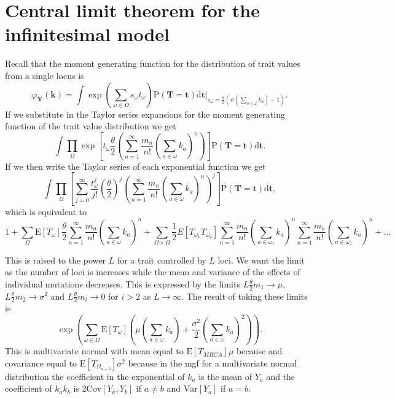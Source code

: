 \documentclass{article}
\newcommand{\T}{\frac{\theta}{2}}
\newcommand{\E}{\mathrm{E}}
\newcommand{\Var}{\mathrm{Var}}
\newcommand{\Cov}{\mathrm{Cov}}
\newcommand{\Pro}{\mathrm{P}}
\begin{document}
 

\clearpage

\appendix
\section{Central limit theorem for the infinitesimal model}
\label{clt}
Recall that the moment generating function for the distribution of trait values
from a single locus is
\begin{equation*}
  \varphi_{\mathbf{Y}}(\mathbf{k}) = \int \exp \left( \sum_{\omega \in \Omega} s_{\omega}t_{\omega} \right)
  \Pro(\mathbf{T}=\mathbf{t})\mathrm{d}\mathbf{t}
  \Bigr|_{s_{\omega}=\frac{\theta}{2} \left( \psi\left(\sum_{a \in \omega}k_{a}\right) -1 \right)}.
\end{equation*}
If we substitute in the Taylor series expansions for the moment generating
function of the trait value distribution we get
\begin{equation*}
  \int \prod_{\Omega} \exp\left[ t_{\omega} \T \left( \sum_{n=1}^{\infty} \frac{m_n}{n!}
    \left( \sum_{a \in \omega} k_a \right)^n \right) \right]
  \Pro(\mathbf{T} = \mathbf{t}) \mathrm{d}\mathbf{t}.
\end{equation*}
If we then write the Taylor series of each exponential function we get
\begin{equation*}
  \int \prod_{\Omega} \left[ \sum_{j=0}^\infty \frac{t_{\omega}^j}{j!}
  \left( \T \right)^j \left( \sum_{n=1}^{\infty} \frac{m_n}{n!}
  \left( \sum_{a \in \omega} k_a \right)^n \right)^j \right]
  \Pro(\mathbf{T} = \mathbf{t}) \mathrm{d}\mathbf{t},
\end{equation*}
which is equivalent to
\begin{equation*}
  1 + \sum_{\Omega} \E[T_\omega] \T \sum_{n=1}^{\infty} \frac{m_n}{n!} \left(
  \sum_{a \in \omega} k_a \right)^n +
  \sum_{\Omega \times \Omega} \frac{1}{2} E[T_{\omega_1}T_{\omega_2}]
  \sum_{n=1}^{\infty} \frac{m_n}{n!} \left(\sum_{a \in \omega_1} k_a \right)^n
  \sum_{n=1}^{\infty} \frac{m_n}{n!} \left(\sum_{a \in \omega_2} k_a \right)^n + \ldots
\end{equation*}

This is raised to the power $L$ for a trait controlled by $L$ loci. We want the
limit as the number of loci is increases while the mean and variance of the
effects of individual mutations decreases. This is expressed by the limits
$L \T m_1 \to \mu$, $L \T m_2\to \sigma^2$ and $L \T m_i\to 0$ for $i>2$ as $L \to \infty$.
The result of taking these limits is 
\begin{equation}
  \label{eq:clt}
  \exp \left( \sum_{\omega \in \Omega}\E[T_{\omega}] \left( \mu \left(
  \sum_{a \in \omega} k_a\right) + \frac{\sigma^2}{2}\left( \sum_{a \in \omega}
  k_a\right)^2\right)\right).
\end{equation}
This is multivariate normal with mean equal to $\E[T_{MRCA}]\mu$ because and
covariance equal to $\E[T_{\Omega_{a+b}}]\sigma^2$ because in the mgf for a
multivariate normal distribution the coefficient in the exponential of $k_a$ is
the mean of $Y_a$ and the coefficient of $k_ak_b$ is $2\Cov[Y_a,Y_b]$ if
$a\neq b$ and $\Var[Y_a]$ if $a=b$.
\end{document}
